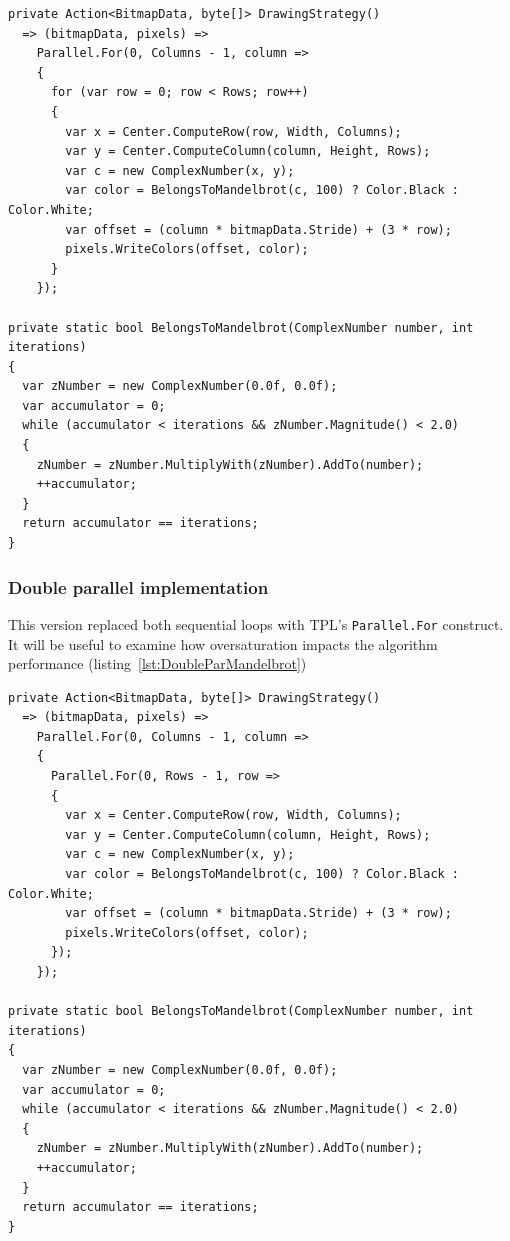 \begin{lstlisting}[style=sharpcstyle, caption={Parallel \texttt{Mandelbrot} algorithm}, label={lst:ParMandelbrot},
numbers=none, xleftmargin=0pt,framexleftmargin=0pt,framexrightmargin=0pt,framexbottommargin=0pt]
private Action<BitmapData, byte[]> DrawingStrategy()
  => (bitmapData, pixels) =>
    Parallel.For(0, Columns - 1, column =>
    {
      for (var row = 0; row < Rows; row++)
      {
        var x = Center.ComputeRow(row, Width, Columns);
        var y = Center.ComputeColumn(column, Height, Rows);
        var c = new ComplexNumber(x, y);
        var color = BelongsToMandelbrot(c, 100) ? Color.Black : Color.White;
        var offset = (column * bitmapData.Stride) + (3 * row);
        pixels.WriteColors(offset, color);
      }
    });

private static bool BelongsToMandelbrot(ComplexNumber number, int iterations)
{
  var zNumber = new ComplexNumber(0.0f, 0.0f);
  var accumulator = 0;
  while (accumulator < iterations && zNumber.Magnitude() < 2.0)
  {
    zNumber = zNumber.MultiplyWith(zNumber).AddTo(number);
    ++accumulator;
  }
  return accumulator == iterations;
}
\end{lstlisting}

\subsubsection{Double parallel implementation}
This version replaced both sequential loops with TPL's \texttt{Parallel.For} construct. It will be useful to examine how oversaturation impacts the algorithm performance (listing~\ref{lst:DoubleParMandelbrot})

\begin{lstlisting}[style=sharpcstyle, caption={Double parallel \texttt{Mandelbrot} algorithm}, label={lst:DoubleParMandelbrot},
numbers=none, xleftmargin=0pt,framexleftmargin=0pt,framexrightmargin=0pt,framexbottommargin=0pt]
private Action<BitmapData, byte[]> DrawingStrategy()
  => (bitmapData, pixels) =>
    Parallel.For(0, Columns - 1, column =>
    {
      Parallel.For(0, Rows - 1, row =>
      {
        var x = Center.ComputeRow(row, Width, Columns);
        var y = Center.ComputeColumn(column, Height, Rows);
        var c = new ComplexNumber(x, y);
        var color = BelongsToMandelbrot(c, 100) ? Color.Black : Color.White;
        var offset = (column * bitmapData.Stride) + (3 * row);
        pixels.WriteColors(offset, color);
      });
    });

private static bool BelongsToMandelbrot(ComplexNumber number, int iterations)
{
  var zNumber = new ComplexNumber(0.0f, 0.0f);
  var accumulator = 0;
  while (accumulator < iterations && zNumber.Magnitude() < 2.0)
  {
    zNumber = zNumber.MultiplyWith(zNumber).AddTo(number);
    ++accumulator;
  }
  return accumulator == iterations;
}
\end{lstlisting}

